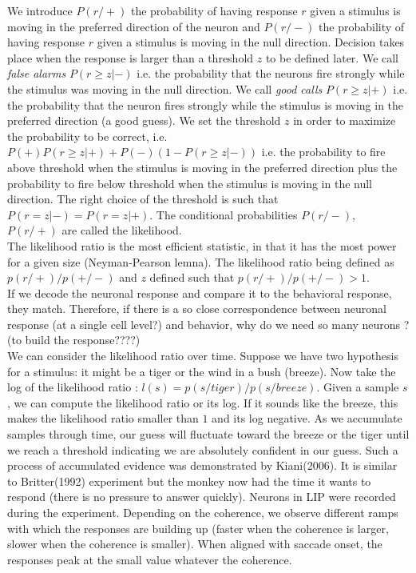 \documentclass[10pt,a4paper]{article}
\begin{document}
We introduce $P(r / +)$ the probability of having response $r$ given a
stimulus is moving in the preferred direction of the neuron and $P(r /
-)$ the probability of having response $r$ given a stimulus is moving
in the null direction. Decision takes place when the response is
larger than a threshold $z$ to be defined later. We call \emph{false
  alarms} $P( r \geq z | -)$ i.e. the probability that the neurons
fire strongly while the stimulus was moving in the null direction. We
call \emph{good calls} $P(r \geq z | +)$ i.e. the probability that the
neuron fires strongly while the stimulus is moving in the preferred
direction (a good guess). We set the threshold $z$ in order to
maximize the probability to be correct, i.e. $P(+) P(r \geq z | +) +
P(-) ( 1 - P( r \geq z | -))$ i.e. the probability to fire above
threshold when the stimulus is moving in the preferred direction plus
the probability to fire below threshold when the stimulus is moving in
the null direction. The right choice of the threshold is such that
$P(r = z | -) = P(r = z | +)$. The conditional probabilities $P(r /
-)$, $P(r / +)$ are called the likelihood. \\

The likelihood ratio is the most efficient statistic, in that it has
the most power for a given size (Neyman-Pearson lemna). The likelihood
ratio being defined as $p(r/+)/p(+/-)$ and $z$ defined such that
$p(r/+)/p(+/-) > 1$.\\

If we decode the neuronal response and compare it to the behavioral
response, they match. Therefore, if there is a so close correspondence
between neuronal response (at a single cell level?) and behavior, why
do we need so many neurons ? (to build the response????)\\

We can consider the likelihood ratio over time. Suppose we have two
hypothesis for a stimulus: it might be a tiger or the wind in a bush
(breeze). Now take the log of the likelihood ratio : $l(s) = p(s /
tiger) / p(s / breeze)$. Given a sample $s$, we can compute the
likelihood ratio or its log. If it sounds like the breeze, this makes
the likelihood ratio smaller than $1$ and its log negative. As we
accumulate samples through time, our guess will fluctuate toward the
breeze or the tiger until we reach a threshold indicating we are
absolutely confident in our guess. Such a process of accumulated
evidence was demonstrated by Kiani(2006). It is similar to
Britter(1992) experiment but the monkey now had the time it wants to
respond (there is no pressure to answer quickly). Neurons in LIP were
recorded during the experiment. Depending on the coherence, we observe
different ramps with which the responses are building up (faster when
the coherence is larger, slower when the coherence is smaller). When
aligned with saccade onset, the responses peak at the small value
whatever the coherence.\\
\end{document}
